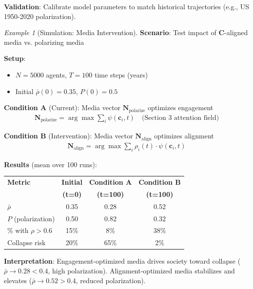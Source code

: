 \documentclass[11pt,a4paper]{article}
\theoremstyle{definition}
\theoremstyle{remark}
\newtheorem{example}{Example}[section]
\newcommand{\cc}{\mathbf{c}}
\begin{document}
\begin{small}
\begin{enumerate}
\begin{protocol}
\textbf{Validation}: Calibrate model parameters to match historical trajectories (e.g., US 1950-2020 polarization).
\end{protocol}

\begin{example}[Simulation: Media Intervention]
\textbf{Scenario}: Test impact of \(\mathbf{C}\)-aligned media vs. polarizing media

\textbf{Setup}:
\begin{itemize}
    \item \(N = 5000\) agents, \(T = 100\) time steps (years)
    \item Initial \(\bar{\rho}(0) = 0.35\), \(P(0) = 0.5\)
\end{itemize}

\textbf{Condition A} (Current): Media vector \(\mathbf{N}_{\text{polarize}}\) optimizes engagement
\begin{align}
\mathbf{N}_{\text{polarize}} = \arg\max \sum_i \psi(\cc_i, t) \quad \text{(Section 3 attention field)}
\end{align}

\textbf{Condition B} (Intervention): Media vector \(\mathbf{N}_{\text{align}}\) optimizes alignment
\begin{align}
\mathbf{N}_{\text{align}} = \arg\max \sum_i \rho_i(t) \cdot \psi(\cc_i, t)
\end{align}

\textbf{Results} (mean over 100 runs):

\begin{table}[H]
\centering
\begin{tabular}{|l|c|c|c|}
\hline
\textbf{Metric} & \textbf{Initial} & \textbf{Condition A} & \textbf{Condition B} \\
& \textbf{(t=0)} & \textbf{(t=100)} & \textbf{(t=100)} \\
\hline
\(\bar{\rho}\) & 0.35 & 0.28 & 0.52 \\
\hline
\(P\) (polarization) & 0.50 & 0.82 & 0.32 \\
\hline
\% with \(\rho > 0.6\) & 15\% & 8\% & 38\% \\
\hline
Collapse risk & 20\% & 65\% & 2\% \\
\hline
\end{tabular}
\end{table}

\textbf{Interpretation}: Engagement-optimized media drives society toward collapse (\(\bar{\rho} \to 0.28 < 0.4\), high polarization). Alignment-optimized media stabilizes and elevates (\(\bar{\rho} \to 0.52 > 0.4\), reduced polarization).


\end{example}
\end{enumerate}
\end{small}
\end{document}
